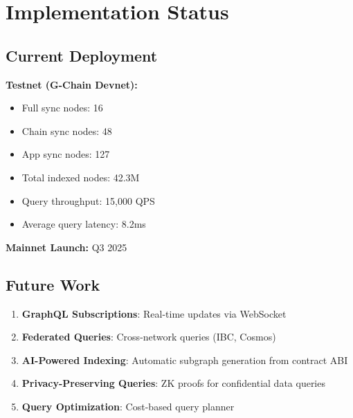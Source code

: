\section{Implementation Status}


\subsection{Current Deployment}

\textbf{Testnet (G-Chain Devnet):}
\begin{itemize}
\item Full sync nodes: 16
\item Chain sync nodes: 48
\item App sync nodes: 127
\item Total indexed nodes: 42.3M
\item Query throughput: 15,000 QPS
\item Average query latency: 8.2ms
\end{itemize}

\textbf{Mainnet Launch:} Q3 2025

\subsection{Future Work}

\begin{enumerate}
\item \textbf{GraphQL Subscriptions}: Real-time updates via WebSocket
\item \textbf{Federated Queries}: Cross-network queries (IBC, Cosmos)
\item \textbf{AI-Powered Indexing}: Automatic subgraph generation from contract ABI
\item \textbf{Privacy-Preserving Queries}: ZK proofs for confidential data queries
\item \textbf{Query Optimization}: Cost-based query planner
\end{enumerate}

